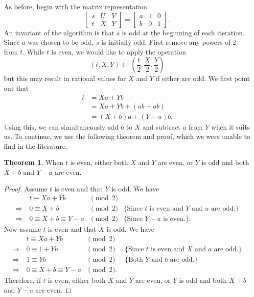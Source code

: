 \documentclass{ucalgthes1}
\theoremstyle{definition}
\newtheorem{thm}{Theorem}[section]
\newcommand{\matrixThreeTwo}[6]{\left[ \begin{array}{rrr} #1 & #2 & #3 \\ #4 & #5 & #6 \end{array} \right]}
\begin{document}
As before, begin with the matrix representation
\[
	\matrixThreeTwo{s}{U}{V}{t}{X}{Y} = \matrixThreeTwo{a}{1}{0}{b}{0}{1}.
\]
An invariant of the algorithm is that $s$ is odd at the beginning of each iteration.  Since $a$ was chosen to be odd, $s$ is initially odd.  First remove any powers of 2 from $t$.  While $t$ is even, we would like to apply the operation
\[
(t, X, Y) \gets \left( \frac{t}{2}, \frac{X}{2}, \frac{Y}{2} \right)
\]
but this may result in rational values for $X$ and $Y$ if either are odd. We first point out that
\begin{align*}
	t &= Xa + Yb \\
	  &= Xa + Yb + (ab - ab) \\
	  &= (X+b)a + (Y-a)b.
\end{align*}
Using this, we can simultaneously add $b$ to $X$ and subtract $a$ from $Y$ when it suits us.  To continue, we use the following theorem and proof, which we were unable to find in the literature.

\begin{thm}
\label{thm:addBSubA}
When $t$ is even, either both $X$ and $Y$ are even, or $Y$ is odd and both $X+b$ and $Y-a$ are even.
\end{thm}

\begin{proof}
Assume $t$ is even and that $Y$ is odd.  We have
\[
\begin{array}{rllr}
	         & t \equiv Xa + Yb & \pmod 2 \\
\Rightarrow~ & 0 \equiv X + b & \pmod 2 & \textrm{\{Since $t$ is even and $Y$ and $a$ are odd.\}} \\
\Rightarrow~ & 0 \equiv X + b \equiv Y - a & \pmod 2 & \textrm{\{Since $Y-a$ is even.\}}. 
\end{array}
\]
Now assume $t$ is even and that $X$ is odd.  We have
\[
\begin{array}{rllr}
	         & t \equiv Xa + Yb & \pmod 2 \\
\Rightarrow~ & 0 \equiv 1 + Yb & \pmod 2 & \textrm{ \{Since $t$ is even and $X$ and $a$ are odd.\}} \\
\Rightarrow~ & 1 \equiv Yb & \pmod 2 & \textrm{ \{Both $Y$ and $b$ are odd.\}} \\
\Rightarrow~ & 0 \equiv X + b \equiv Y - a & \pmod 2. 
\end{array}
\]
Therefore, if $t$ is even, either both $X$ and $Y$ are even, or $Y$ is odd and both $X+b$ and $Y-a$ are even.
\end{proof}
\end{document}
